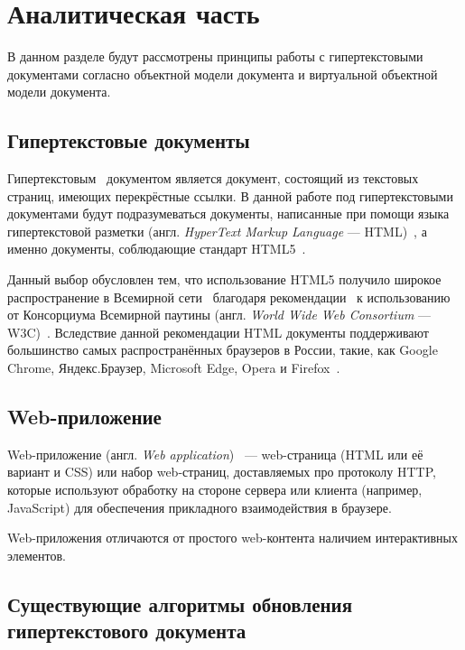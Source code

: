 \section{Аналитическая часть} \label{analysis}

В данном разделе будут рассмотрены принципы работы с гипертекстовыми документами согласно объектной модели документа и виртуальной объектной модели документа.

\subsection{Гипертекстовые документы}

Гипертекстовым~\cite{hypertext} документом является документ, состоящий из текстовых страниц, имеющих перекрёстные ссылки.
В данной работе под гипертекстовыми документами будут подразумеваться документы, написанные при помощи языка гипертекстовой разметки (англ. \textit{HyperText Markup Language} --- HTML)~\cite{html}, а именно документы, соблюдающие стандарт HTML5~\cite{html-doc}.


Данный выбор обусловлен тем, что использование HTML5 получило широкое распространение в Всемирной сети~\cite{internet} благодаря рекомендации~\cite{html-recommendation} к использованию от Консорциума Всемирной паутины (англ. \textit{World Wide Web \newline Consortium} --- W3C)~\cite{w3c}.
Вследствие данной рекомендации HTML документы поддерживают большинство самых распространённых браузеров в России, такие, как Google Chrome, Яндекс.Браузер, Microsoft Edge, Opera и Firefox~\cite{browser-popularity-russia}.

\subsection{Web-приложение}

Web-приложение (англ. \textit{Web application})~\cite{web-application-definition}  --- web-страница (HTML или её вариант и CSS) или набор web-страниц, доставляемых про протоколу HTTP, которые используют обработку на стороне сервера или клиента (например, \linebreak JavaScript) для обеспечения прикладного взаимодействия в браузере.

Web-приложения отличаются от простого web-контента наличием интерактивных элементов.

\subsection{Существующие алгоритмы обновления гипертекстового документа}

